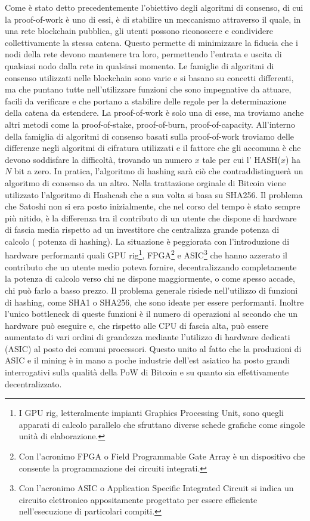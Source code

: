 	Come è stato detto precedentemente l'obiettivo degli algoritmi di consenso, di cui la proof-of-work è uno di essi, è di stabilire un meccanismo attraverso il quale, in una rete blockchain pubblica, gli utenti possono riconoscere e condividere collettivamente la stessa catena. Questo permette di minimizzare la fiducia che i nodi della rete devono mantenere tra loro, permettendo l'entrata e uscita di qualsiasi nodo dalla rete in qualsiasi momento.
	Le famiglie di algoritmi di consenso utilizzati nelle blockchain sono varie e si basano su concetti differenti, ma che puntano tutte nell'utilizzare funzioni che sono impegnative da attuare, facili da verificare e che portano a stabilire delle regole per la determinazione della catena da estendere. La proof-of-work è solo una di esse, ma troviamo anche altri metodi come la proof-of-stake, proof-of-burn, proof-of-capacity.
	All'interno della famiglia di algoritmi di consenso basati sulla proof-of-work troviamo delle differenze negli algoritmi di cifratura utilizzati e il fattore che gli accomuna è che devono soddisfare la difficoltà, trovando un numero $x$ tale per cui l' HASH($x$) ha $N$ bit a zero.
	In pratica, l'algoritmo di hashing sarà ciò che contraddistinguerà un algoritmo di consenso da un altro. Nella trattazione orginale di Bitcoin viene utilizzato l'algoritmo di Hashcash che a sua volta si basa su SHA256. Il problema che Satoshi non si era posto inizialmente, che nel corso del tempo è stato sempre più nitido, è la differenza tra il contributo di un utente che dispone di hardware di fascia media rispetto ad un investitore che centralizza grande potenza di calcolo ( potenza di hashing). La situazione è peggiorata con l'introduzione di hardware performanti quali GPU rig\footnote{I GPU rig, letteralmente impianti Graphics Processing Unit, sono quegli apparati di calcolo parallelo che sfruttano diverse schede grafiche come singole unità di elaborazione.}, FPGA\footnote{Con l'acronimo FPGA o Field Programmable Gate Array è un dispositivo che consente la programmazione dei circuiti integrati.} e ASIC\footnote{Con l'acronimo ASIC o Application Specific Integrated Circuit si indica un circuito elettronico appositamente progettato per essere efficiente nell'esecuzione di particolari compiti.} che hanno azzerato il contributo che un utente medio poteva fornire, decentralizzando completamente la potenza di calcolo verso chi ne dispone maggiormente, o come spesso accade, chi può farlo a basso prezzo. 
	Il problema generale risiede nell'utilizzo di funzioni di hashing, come SHA1 o SHA256, che sono ideate per essere performanti. Inoltre l'unico bottleneck di queste funzioni è il numero di operazioni al secondo che un hardware può eseguire e, che rispetto alle CPU di fascia alta, può essere aumentato di vari ordini di grandezza mediante l'utilizzo di hardware dedicati (ASIC) al posto dei comuni processori. 
	Questo unito al fatto che la produzioni di ASIC e il mining è in mano a poche industrie dell'est asiatico ha posto grandi interrogativi sulla qualità della PoW di Bitcoin e su quanto sia effettivamente decentralizzato.
	
